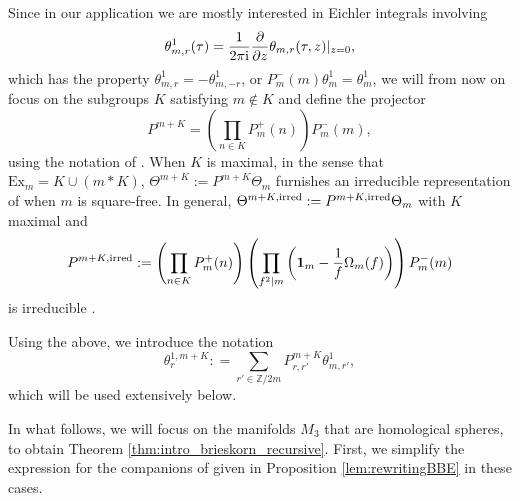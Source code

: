 \documentclass[pdftex]{sigma}
\def\BZ{\mathbb{Z}}
\def\bv{{\vec{\underline{b}}}}
\theoremstyle{definition}
\numberwithin{equation}{section}
\begin{document}
Since in our application we are mostly interested in Eichler integrals involving \[\theta^1_{m,r}(\tau) = \frac{1}{2\pi {\rm i}}\frac{\partial}{\partial z} \theta_{m,r}(\tau,z)\lvert_{z=0},\] which has the property $\theta^1_{m,r} = -\theta^1_{m,-r} $, or $P^-_m(m)\theta^1_{m}=\theta^1_{m}$, we will from now on focus on the subgroups $K$ satisfying $m\not\in K$ and define the projector
\begin{equation}\label{dfn:projB}
P^{m+K} = \left(\prod_{n\in K}P^+_m(n)\right)
P^-_m(m),
\end{equation}
using the notation of \cite{cheng20193d}. When $K$ is maximal, in the sense that $\mathrm{Ex}_m = K\cup (m\ast K)$, $\Theta^{m+K}:=P^{m+K} \Theta_m$ furnishes an irreducible representation of \smash{$\widetilde{{\rm SL}_2}(\BZ)$} when $m$ is square-free. In general, $\Theta^{m+K,{\rm irred}}:=P^{m+K,{\rm irred}} \Theta_m$ with
$K$ maximal and
\begin{equation}\label{irred_weil}
P^{m+K, {\rm irred}} := \left(\prod_{n\in K}P^+_m(n)\right) \left(
\prod_{f^2|m}\left(\mathbf{1}_m-\frac{1}{f} \Omega_m(f) \right)
\right)
P^-_m(m)
\end{equation}
is irreducible \cite{SkoruppaThesis, 2007arXiv0707.0718S}.

Using the above, we introduce the notation
\begin{equation}\label{WeylorbitSU2}
 \theta_r^{1,m+K}: =\sum_{r'\in\BZ/2m} P^{m+K}_{r,r'}\theta^1_{m,r'},
\end{equation}
which will be used extensively below.

In what follows, we will focus on the manifolds $M_3$ that are homological spheres, to obtain Theorem \ref{thm:intro_brieskorn_recursive}. First, we simplify the expression for the companions of \smash{$\widehat Z^{{\rm SU}(3)}_\bv(M_3)$} given in Proposition \ref{lem:rewritingBBE} in these cases.
\end{document}
